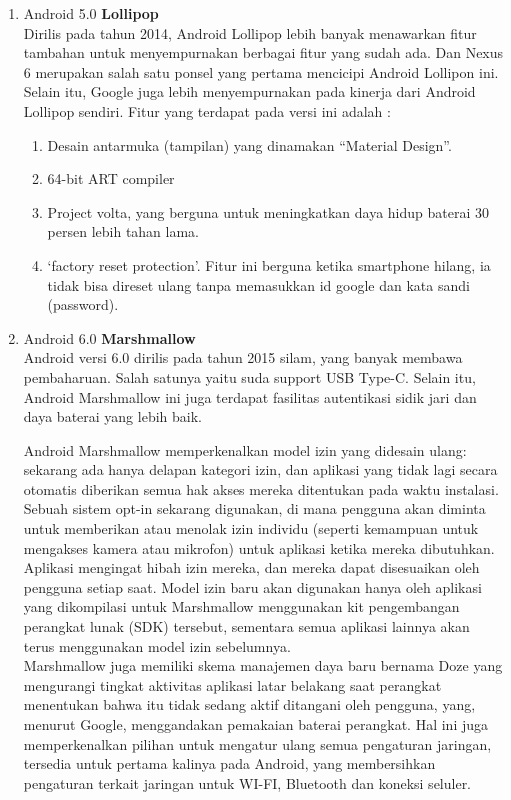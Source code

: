 \begin{enumerate}
\item Android 5.0 \textbf{Lollipop}\\
Dirilis pada tahun 2014, Android Lollipop lebih banyak menawarkan fitur tambahan untuk menyempurnakan berbagai fitur yang sudah ada. Dan Nexus 6 merupakan salah satu ponsel yang pertama mencicipi Android Lollipon ini. Selain itu, Google juga lebih menyempurnakan pada kinerja dari Android Lollipop sendiri. Fitur yang terdapat pada versi ini adalah : 
\begin{enumerate}
    \item Desain antarmuka (tampilan) yang dinamakan “Material Design”.
    \item 64-bit ART compiler
    \item Project volta, yang berguna untuk meningkatkan daya hidup baterai 30 persen lebih tahan lama.
    \item ‘factory reset protection’. Fitur ini berguna ketika smartphone hilang, ia tidak bisa direset ulang tanpa memasukkan id google dan kata sandi (password).
\end{enumerate}

\item Android 6.0 \textbf{Marshmallow}\\
Android versi 6.0 dirilis pada tahun 2015 silam, yang banyak membawa pembaharuan. Salah satunya yaitu suda support USB Type-C. Selain itu, Android Marshmallow ini juga terdapat fasilitas autentikasi sidik jari dan daya baterai yang lebih baik. 

Android Marshmallow memperkenalkan model izin yang didesain ulang: sekarang ada hanya delapan kategori izin, dan aplikasi yang tidak lagi secara otomatis diberikan semua hak akses mereka ditentukan pada waktu instalasi. Sebuah sistem opt-in sekarang digunakan, di mana pengguna akan diminta untuk memberikan atau menolak izin individu (seperti kemampuan untuk mengakses kamera atau mikrofon) untuk aplikasi ketika mereka dibutuhkan. Aplikasi mengingat hibah izin mereka, dan mereka dapat disesuaikan oleh pengguna setiap saat. Model izin baru akan digunakan hanya oleh aplikasi yang dikompilasi untuk Marshmallow menggunakan kit pengembangan perangkat lunak (SDK) tersebut, sementara semua aplikasi lainnya akan terus menggunakan model izin sebelumnya.\\

Marshmallow juga memiliki skema manajemen daya baru bernama Doze yang mengurangi tingkat aktivitas aplikasi latar belakang saat perangkat menentukan bahwa itu tidak sedang aktif ditangani oleh pengguna, yang, menurut Google, menggandakan pemakaian baterai perangkat. Hal ini juga memperkenalkan pilihan untuk mengatur ulang semua pengaturan jaringan, tersedia untuk pertama kalinya pada Android, yang membersihkan pengaturan terkait jaringan untuk WI-FI, Bluetooth dan koneksi seluler.


\end{enumerate}
